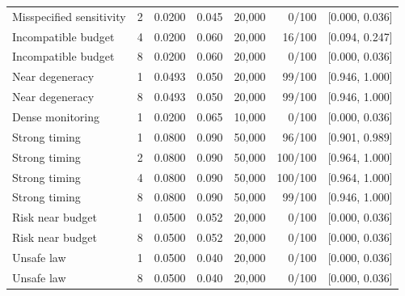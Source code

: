 \begin{longtable}{lrrrrrl}
Misspecified sensitivity & 2 & 0.0200 & 0.045 & 20,000 & 0/100 & [0.000, 0.036]\\
Incompatible budget & 4 & 0.0200 & 0.060 & 20,000 & 16/100 & [0.094, 0.247]\\
Incompatible budget & 8 & 0.0200 & 0.060 & 20,000 & 0/100 & [0.000, 0.036]\\
Near degeneracy & 1 & 0.0493 & 0.050 & 20,000 & 99/100 & [0.946, 1.000]\\
Near degeneracy & 8 & 0.0493 & 0.050 & 20,000 & 99/100 & [0.946, 1.000]\\
Dense monitoring & 1 & 0.0200 & 0.065 & 10,000 & 0/100 & [0.000, 0.036]\\
Strong timing & 1 & 0.0800 & 0.090 & 50,000 & 96/100 & [0.901, 0.989]\\
Strong timing & 2 & 0.0800 & 0.090 & 50,000 & 100/100 & [0.964, 1.000]\\
Strong timing & 4 & 0.0800 & 0.090 & 50,000 & 100/100 & [0.964, 1.000]\\
Strong timing & 8 & 0.0800 & 0.090 & 50,000 & 99/100 & [0.946, 1.000]\\
Risk near budget & 1 & 0.0500 & 0.052 & 20,000 & 0/100 & [0.000, 0.036]\\
Risk near budget & 8 & 0.0500 & 0.052 & 20,000 & 0/100 & [0.000, 0.036]\\
Unsafe law & 1 & 0.0500 & 0.040 & 20,000 & 0/100 & [0.000, 0.036]\\
Unsafe law & 8 & 0.0500 & 0.040 & 20,000 & 0/100 & [0.000, 0.036]\\\bottomrule\end{longtable}\normalsize

